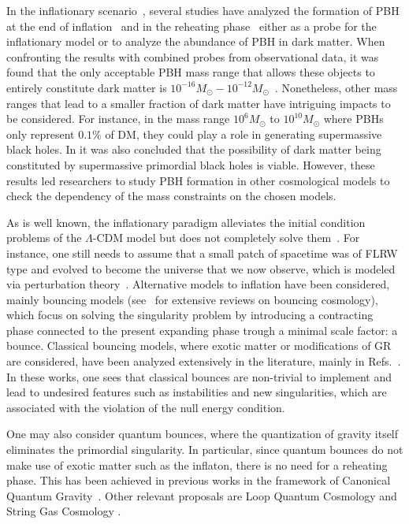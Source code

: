 \documentclass[a4paper,11pt]{article}
\begin{document}
In the inflationary scenario~\cite{Starobinskii1979, Guth1981, Bardeen1983, Linde1982}, several studies have analyzed the formation of PBH at the end of inflation~\cite{Bullock1997, Yokoyama1998, Josan2010, Ballesteros2018, Wang2024} and in the reheating phase~\cite{Carr2018, Martin2020} either as a probe for the inflationary model or to analyze the abundance of PBH in dark matter. When confronting the results with combined probes from observational data, it was found that the only acceptable PBH mass range that allows these objects to entirely constitute dark matter is $10^{-16}M_\odot - 10^{-12}M_\odot$~\cite{Carr2022, Villanueva2021}. Nonetheless, other mass ranges that lead to a smaller fraction of dark matter have intriguing impacts to be considered. For instance, in the mass range $10^6M_\odot$ to $10^{10} M_\odot$ where PBHs only represent $0.1\%$ of DM, they could play a role in generating supermassive black holes. In \cite{Garcia2017} it was also concluded that the possibility of dark matter being constituted by supermassive primordial black holes is viable. However, these results led researchers to study PBH formation in other cosmological models to check the dependency of the mass constraints on the chosen models.

 As is well known, the inflationary paradigm alleviates the initial condition problems of the $\Lambda$-CDM model but does not completely solve them~\cite{Guth1981,nelson2021bouncing, PatrickReview2}. For instance, one still needs to assume that a small patch of spacetime was of FLRW type and evolved to become the universe that we now observe, which is modeled via perturbation theory~\cite{covariant_bardeen}. Alternative models to inflation have been considered, mainly bouncing models (see~\cite{Gasperini1993, Gasperini1994, Lyth, Finelli, Wands1999, Brandenberger2001, Peter2002, Hwang2002, Vitenti2012, Vitenti2013, PatrickReview1} for extensive reviews on bouncing cosmology), which focus on solving the singularity problem by introducing a contracting phase connected to the present expanding phase trough a minimal scale factor: a bounce. Classical bouncing models, where exotic matter or modifications of GR are considered, have been analyzed extensively in the literature, mainly in Refs.~\cite{PatrickReview1, PatrickReview2}. In these works, one sees that classical bounces are non-trivial to implement and lead to undesired features such as instabilities and new singularities, which are associated with the violation of the null energy condition. 

One may also consider quantum bounces, where the quantization of gravity itself eliminates the primordial singularity. In particular, since quantum bounces do not make use of exotic matter such as the inflaton, there is no need for a reheating phase. This has been achieved in previous works in the framework of Canonical Quantum Gravity~\cite{nelson_peter_bouncing_original}. Other relevant proposals are Loop Quantum Cosmology \cite{loop_quantum_gravity_perturbations_application,loop_phenomenology} and String Gas Cosmology \cite{PatrickReview2, PatrickReview1}.
     
\end{document}
